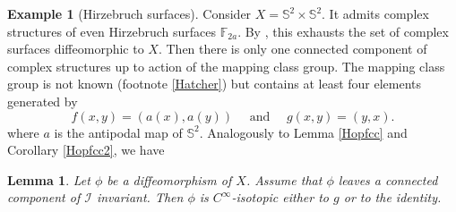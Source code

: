 \documentclass[10pt]{amsart}
\let\mathcal\mathscr
\theoremstyle{plain}
\newtheorem{lemma}[theorem]{Lemma}
\theoremstyle{definition}
\newtheorem{example}[theorem]{Example}
\theoremstyle{remark}
\numberwithin{equation}{section}
\newcommand{\cI}{\mathcal{I}}
\begin{document}
\begin{example}[Hirzebruch surfaces]
\label{Hirzebruch}
Consider $X=\mathbb S^2\times\mathbb S^2$. It admits complex structures of even Hirzebruch surfaces $\mathbb F_{2a}$. By \cite{F-Q}, this exhausts the set of complex surfaces diffeomorphic to $X$. Then there is only one connected component of complex structures up to action of the mapping class group. The mapping class group is not known (\cf footnote \ref{Hatcher}) but contains at least four elements generated by
\[
f(x,y)=(a(x),a(y))\quad\text{ and }\quad g(x,y)=(y,x).
\]
where $a$ is the antipodal map of $\mathbb S^2$. Analogously to Lemma \ref{Hopfcc} and Corollary \ref{Hopfcc2}, we have
\begin{lemma}
\label{Hirzebruchcc}
Let $\phi$ be a diffeomorphism of $X$. Assume that $\phi$ leaves a connected component of $\cI$ invariant. Then $\phi$ is $C^\infty$-isotopic either to $g$ or to the identity.
\end{lemma}


\end{example}
\end{document}
